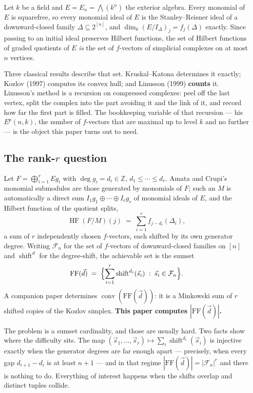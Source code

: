 \documentclass[11pt, a4paper, abstract=yes]{scrartcl}
\theoremstyle{definition}
\theoremstyle{remark}
\theoremstyle{plain}
\newcommand{\vek}[1]{\boldsymbol{#1}}
\newcommand{\shift}{\operatorname{shift}}
\newcommand{\conv}{\operatorname{conv}}
\newcommand{\HF}{\operatorname{HF}}
\renewcommand{\vek}[1]{\vec{#1}}
\begin{document}
Let \(k\) be a field and \(E=E_n=\bigwedge(k^n)\) the exterior algebra. Every monomial of \(E\) is
squarefree, so every monomial ideal of \(E\) is the Stanley--Reisner ideal of a downward-closed
family \(\Delta\subseteq2^{[n]}\), and \(\dim_k(E/I_\Delta)_j=f_j(\Delta)\) exactly. Since passing to
an initial ideal preserves Hilbert functions, the set of Hilbert functions of graded quotients of
\(E\) \emph{is} the set of \(f\)-vectors of simplicial complexes on at most \(n\) vertices.

Three classical results describe that set. Kruskal--Katona determines it exactly; Kozlov (1997)
computes its convex hull; and Linusson (1999) \textbf{counts} it. Linusson's method is a recursion on
compressed complexes: peel off the last vertex, split the complex into the part avoiding it and the
link of it, and record how far the first part is filled. The bookkeeping variable of that recursion
--- his \(E^p(n,k)\), the number of \(f\)-vectors that are maximal up to level \(k\) and no further
--- is the object this paper turns out to need.
\subsection{The rank-\(r\) question}
\label{sec:org64dbba5}

Let \(F=\bigoplus_{i=1}^rEg_i\) with \(\deg g_i=d_i\in\mathbb Z\), \(d_1\le\cdots\le d_r\). Amata and
Crupi's monomial submodules are those generated by monomials of \(F\); such an \(M\) is automatically
a direct sum \(I_1g_1\oplus\cdots\oplus I_rg_r\) of monomial ideals of \(E\), and the Hilbert function
of the quotient splits,
\[
  \HF(F/M)(j)\;=\;\sum_{i=1}^{r}f_{j-d_i}(\Delta_i),
\]
a sum of \(r\) independently chosen \(f\)-vectors, each shifted by its own generator degree. Writing
\(\mathcal F_n\) for the set of \(f\)-vectors of downward-closed families on \([n]\) and
\(\shift^d\) for the degree-shift, the achievable set is the sumset
\[
  \mathrm{FF}(\vek d)\;=\;\Bigl\lbrace\sum_{i=1}^{r}\shift^{d_i}(\vek s_i)\;:\;\vek s_i\in\mathcal F_n\Bigr\rbrace .
\]
A companion paper determines \(\conv(\mathrm{FF}(\vek d))\): it is a Minkowski sum of \(r\) shifted copies
of the Kozlov simplex. \textbf{This paper computes \(|\mathrm{FF}(\vek d)|\).}

The problem is a sumset cardinality, and those are usually hard. Two facts show where the difficulty
sits. The map \((\vek s_1,\dots,\vek s_r)\mapsto\sum_i\shift^{d_i}(\vek s_i)\) is injective exactly when the
generator degrees are far enough apart --- precisely, when every gap \(d_{i+1}-d_i\) is at least
\(n+1\) --- and in that regime \(|\mathrm{FF}(\vek d)|=|\mathcal F_n|^r\) and there is nothing to do.
Everything of interest happens when the shifts overlap and distinct tuples collide.
\end{document}
